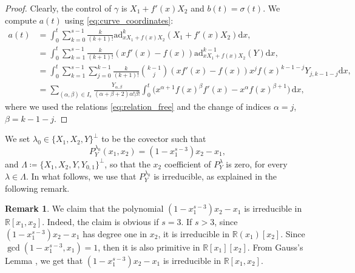 \documentclass[a4paper,11pt,reqno]{amsart}
\theoremstyle{plain}
\theoremstyle{definition}
\newtheorem{remark}[theorem]{Remark}
\newcommand{\R}{\mathbb R}
\newcommand{\de}{\mathrm{d}}
\newcommand{\ad}{\mathrm{ad}}
\begin{document}
\begin{proof}
    Clearly, the control of $\gamma$ is $X_1+f'(x)X_2$ and  $b(t)=\sigma(t)$. We compute $a(t)$ using \eqref{eq:curve_coordinates}:
    \begin{align*}
        a(t) &= \int^t_0 \sum_{k=0}^{s-1} \frac{k}{(k+1)!} \ad^k_{xX_1+f(x)X_2}(X_1 + f'(x)X_2) \de x, \\
        &= \int^t_0 \sum_{k=1}^{s-1} \frac{k}{(k+1)!} (xf'(x)-f(x)) \ad^{k-1}_{xX_1+f(x)X_2}(Y) \de x, \\
        &= \int^t_0 \sum_{k=1}^{s-1} \sum_{j=0}^{k-1} \frac{k}{(k+1)!} \binom{k-1}{j} (xf'(x)-f(x))x^jf(x)^{k-1-j}Y_{j,k-1-j} \de x, \\
        &= \sum_{(\alpha,\beta) \in I_s} \frac{Y_{\alpha,\beta}}{(\alpha+\beta+2)\alpha!\beta!}\int^t_0 \bigg(x^{\alpha+1}f(x)^\beta f'(x) - x^\alpha f(x)^{\beta+1}\bigg)\, \de x,
    \end{align*}
    where we used the relations \eqref{eq:relation_free} and the change of indices $\alpha = j$, $\beta = k-1-j$.
\end{proof}

We set $\lambda_0\in\{X_1,X_2,Y\}^{\perp}$ to be the covector such that 
\begin{equation*}
    P^{\lambda_0}_Y(x_1,x_2) = (1-x_1^{s-3})x_2-x_1,
\end{equation*}
and $\Lambda \coloneq  \{X_1,X_2,Y,Y_{0,1}\}^{\perp}$, so that the $x_2$ coefficient of $P^\lambda_Y$ is zero, for every $\lambda \in \Lambda$. In what follows, we use that $P^{\lambda_0}_Y$ is irreducible, as explained in the following remark.
\begin{remark} \label{rem:irreducible}
    We claim that the polynomial $(1-x_1^{s-3})x_2-x_1$ is irreducible in $\R[x_1,x_2]$. Indeed, the claim is obvious if $s=3$. If $s >3$, since $(1-x_1^{s-3})x_2-x_1$ has degree one in $x_2$, it is irreducible in $\R(x_1)[x_2]$. Since $\gcd(1-x_1^{s-3},x_1)=1$, then it is also primitive in $\R[x_1][x_2]$. From Gauss's Lemma \cite[Exercise~3.4]{MR1322960}, we get that $(1-x_1^{s-3})x_2-x_1$ is irreducible in $\R[x_1,x_2]$.
\end{remark}
\end{document}
